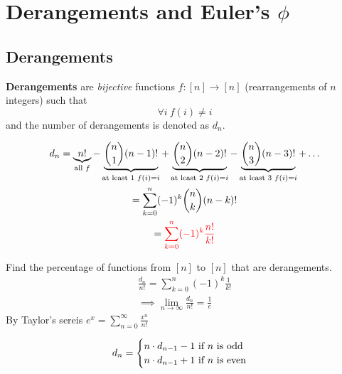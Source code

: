 \documentclass{article}
\begin{document}
		\section{Derangements and Euler's $\phi$}
			\subsection{Derangements}
				\begin{definition}
					\textbf{Derangements} are \emph{bijective} functions $f:[n] \to [n]$ (rearrangements of $n$ integers) such that 
					\begin{equation}
						\forall i\ f(i) \neq i
					\end{equation}
					and the number of derangements is denoted as $d_n$.
				\end{definition}
				
				\begin{theorem}
					\begin{gather}
						d_n = 
						\underbrace{n!}_{\text{{all }}f}
						- \underbrace{\binom{n}{1} (n-1)!}_{\text{{at least 1 }}f(i) = i}
						+ \underbrace{\binom{n}{2} (n-2)!}_{\text{{at least 2 }}f(i) = i}
						- \underbrace{\binom{n}{3} (n-3)!}_{\text{{at least 3 }}f(i) = i} + \dots \\
						= \sum_{k=0}^n (-1)^k \binom{n}{k}(n-k)! \\
						= \textcolor{red}{\sum_{k=0}^n (-1)^k \frac{n!}{k!}}
					\end{gather}
				\end{theorem}
				
				\begin{theorem}
					Find the percentage of functions from $[n]$ to $[n]$ that are derangements.
					\begin{gather}
						\frac{d_n}{n!} = \sum_{k=0}^n (-1)^k \frac{1}{k!} \\
						\implies \lim_{n\to \infty} \frac{d_n}{n!} = \frac{1}{e}
					\end{gather}
					By Taylor's sereis $e^x = \sum_{n=0}^\infty \frac{x^n}{n!}$
				\end{theorem}
				
				\begin{proposition}
					\begin{equation}
						d_n = \begin{cases}
							n \cdot d_{n-1} - 1 \text{{ if $n$ is odd}} \\
							n \cdot d_{n-1} + 1 \text{{ if $n$ is even}}
						\end{cases}
					\end{equation}
				\end{proposition}
				
\end{document}
